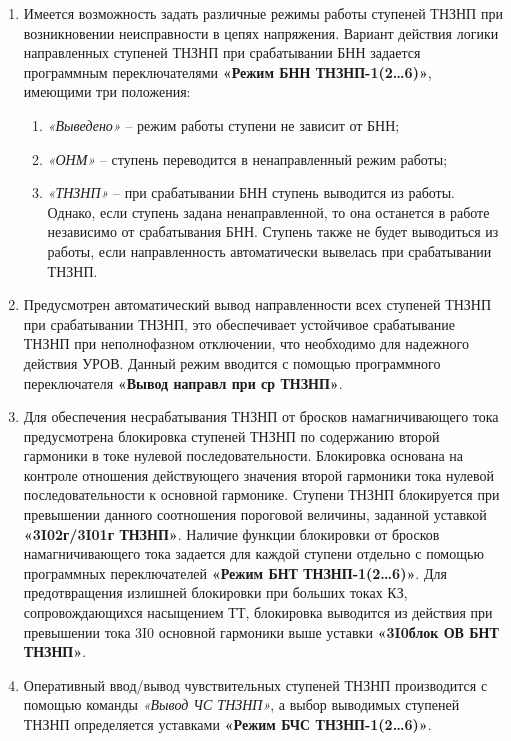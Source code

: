 \begin{enumerate}[label=\arabic{section}.\arabic{subsection}.\arabic*,  align=left, labelsep=4pt, leftmargin=0pt, itemindent=57pt]
\item
Имеется возможность задать различные режимы работы ступеней ТНЗНП при возникновении
неисправности в цепях напряжения. Вариант действия логики направленных ступеней ТНЗНП при
срабатывании БНН задается программным переключателями \textbf{«Режим БНН ТНЗНП-1(2…6)»}, имеющими три
положения:

\begin{enumerate}[label=\arabic*)]
    \item \textit{«Выведено»} -- режим работы ступени не зависит от БНН;
    \item \textit{«ОНМ»} -- ступень переводится в ненаправленный режим работы;
    \item \textit{«ТНЗНП»} -- при срабатывании БНН ступень выводится из работы. Однако, если ступень задана ненаправленной, то она останется в работе независимо от срабатывания БНН. Ступень также не будет выводиться из работы, если направленность автоматически вывелась при срабатывании ТНЗНП.
\end{enumerate}

\item
Предусмотрен автоматический вывод направленности всех ступеней ТНЗНП при срабатывании ТНЗНП,
это обеспечивает устойчивое срабатывание ТНЗНП при неполнофазном отключении, что необходимо для
надежного действия УРОВ. Данный режим вводится с помощью программного переключателя \textbf{«Вывод направл при ср ТНЗНП»}.

\item
Для обеспечения несрабатывания ТНЗНП от бросков намагничивающего тока предусмотрена
блокировка ступеней ТНЗНП по содержанию второй гармоники в токе нулевой последовательности.
Блокировка основана на контроле отношения действующего значения второй гармоники тока нулевой
последовательности к основной гармонике. Ступени ТНЗНП блокируется при превышении данного
соотношения пороговой величины, заданной уставкой \textbf{«3I02г/3I01г ТНЗНП»}. Наличие функции блокировки от
бросков намагничивающего тока задается для каждой ступени отдельно с помощью программных
переключателей \textbf{«Режим БНТ ТНЗНП-1(2…6)»}. Для предотвращения излишней блокировки при больших токах
КЗ, сопровождающихся насыщением ТТ, блокировка выводится из действия при превышении тока 3I0
основной гармоники выше уставки \textbf{«3I0блок ОВ БНТ ТНЗНП»}.

\item
Оперативный ввод/вывод чувствительных ступеней ТНЗНП производится с помощью команды \textit{«Вывод
ЧС ТНЗНП»}, а выбор выводимых ступеней ТНЗНП определяется уставками \textbf{«Режим БЧС ТНЗНП-1(2…6)»}.


\end{enumerate}
